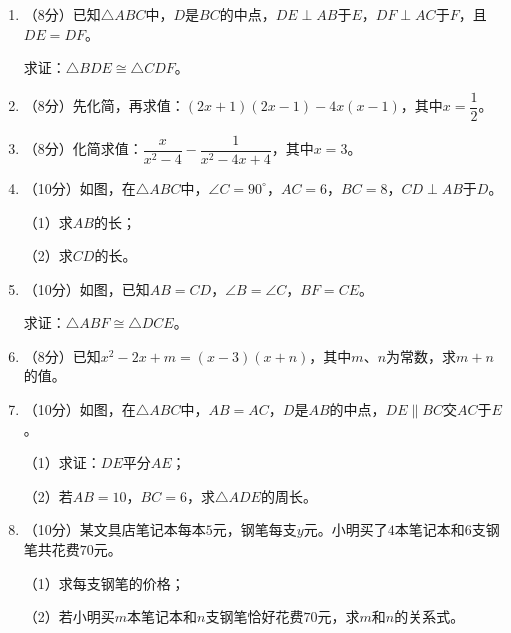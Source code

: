 \documentclass[12pt, a4paper]{ctexart}
\begin{document}
\begin{enumerate}[label=\arabic*., start=17]

\item （8分）已知$\triangle ABC$中，$D$是$BC$的中点，$DE\perp AB$于$E$，$DF\perp AC$于$F$，且$DE=DF$。

求证：$\triangle BDE \cong \triangle CDF$。

\vspace{6cm}

\item （8分）先化简，再求值：$(2x+1)(2x-1)-4x(x-1)$，其中$x=\dfrac{1}{2}$。

\vspace{6cm}

\item （8分）化简求值：$\dfrac{x}{x^{2}-4}-\dfrac{1}{x^{2}-4x+4}$，其中$x=3$。

\vspace{6cm}

\item （10分）如图，在$\triangle ABC$中，$\angle C=90^{\circ}$，$AC=6$，$BC=8$，$CD\perp AB$于$D$。

（1）求$AB$的长；

（2）求$CD$的长。

\vspace{6cm}

\item （10分）如图，已知$AB=CD$，$\angle B=\angle C$，$BF=CE$。

求证：$\triangle ABF \cong \triangle DCE$。

\vspace{6cm}

\item （8分）已知$x^{2}-2x+m=(x-3)(x+n)$，其中$m$、$n$为常数，求$m+n$的值。

\vspace{6cm}

\item （10分）如图，在$\triangle ABC$中，$AB=AC$，$D$是$AB$的中点，$DE\parallel BC$交$AC$于$E$。

（1）求证：$DE$平分$AE$；

（2）若$AB=10$，$BC=6$，求$\triangle ADE$的周长。

\vspace{6cm}

\item （10分）某文具店笔记本每本$5$元，钢笔每支$y$元。小明买了$4$本笔记本和$6$支钢笔共花费$70$元。

（1）求每支钢笔的价格；

（2）若小明买$m$本笔记本和$n$支钢笔恰好花费$70$元，求$m$和$n$的关系式。

\vspace{6cm}

\end{enumerate}
\end{document}
